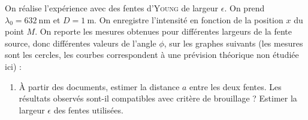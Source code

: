 \documentclass[a4paper,french,bookmarks]{article}
\begin{document}
    On réalise l'expérience avec des fentes d'\textsc{Young} de largeur $\epsilon$. On prend $\lambda_0 = \qty{632}{\nm}$ et $D = \qty{1}{\m}$. On enregistre l'intensité en fonction de la position $x$ du point $M$. On reporte les mesures obtenues pour différentes largeurs de la fente source, donc différentes valeurs de l'angle $\phi$, sur les graphes suivants (les mesures sont les cercles, les courbes correspondent à une prévision théorique non étudiée ici) :
    
    \begin{center}
        
    \end{center}
    
    \begin{enumerate}[resume]
        \item À partir des documents, estimer la distance $a$ entre les deux fentes. Les résultats observés sont-il compatibles avec critère de brouillage ? Estimer la largeur $\epsilon$ des fentes utilisées.
    \end{enumerate}
    
    
\end{document}
